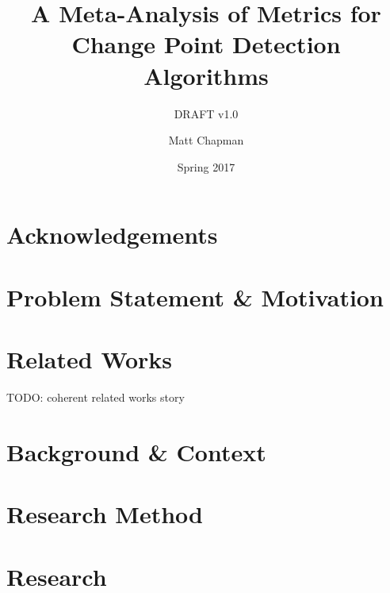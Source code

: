 \documentclass{uvamscse}	%
\title{A Meta-Analysis of Metrics for Change Point Detection Algorithms}
\subtitle{DRAFT v1.0}
\date{Spring 2017}
\author{Matt Chapman}
\begin{document}
\maketitle


\chapter*{Acknowledgements}




\chapter{Problem Statement \& Motivation}




\chapter{Related Works}

TODO: coherent related works story


\chapter{Background \& Context}




\chapter{Research Method}
\label{Research Method}




\chapter{Research}
\end{document}
